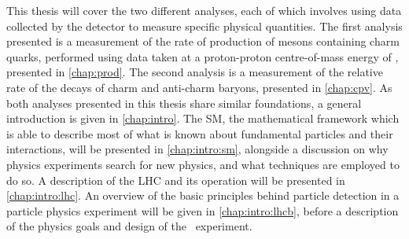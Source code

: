 This thesis will cover the two different analyses, each of which involves using 
data collected by the detector to measure specific physical quantities.
The first analysis presented is a measurement of the rate of production of 
mesons containing charm quarks, performed using data taken at a proton-proton 
centre-of-mass energy of \runtwocom, presented in \cref{chap:prod}.
The second analysis is a measurement of the relative rate of the decays of 
charm and anti-charm baryons, presented in \cref{chap:cpv}.
As both analyses presented in this thesis share similar foundations, a general 
introduction is given in \cref{chap:intro}.
The \acl{SM}, the mathematical framework which is able to describe most of what 
is known about fundamental particles and their interactions, will be presented 
in \cref{chap:intro:sm}, alongside a discussion on why physics experiments 
search for new physics, and what techniques are employed to do so.
A description of the \acl{LHC} and its operation will be presented in 
\cref{chap:intro:lhc}.
An overview of the basic principles behind particle detection in a particle 
physics experiment will be given in \cref{chap:intro:lhcb}, before a 
description of the physics goals and design of the \lhcb\ experiment.
